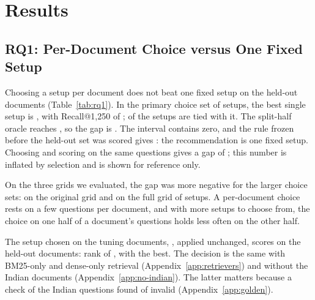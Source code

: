 \section{Results}
\label{sec:results}

\subsection{RQ1: Per-Document Choice versus One Fixed Setup}
\label{sec:rq1}

\begin{table}[t]
\centering
{}
\caption{RQ1 on the held-out documents (\RQoneDocuments{} documents and \RQoneQuestions{} questions in every choice set; hybrid retrieval, Recall@1,250). Short names: Appendix~\ref{app:key}.}
\label{tab:rq1}
\end{table}

Choosing a setup per document does not beat one fixed setup on the
held-out documents (Table~\ref{tab:rq1}). In the primary choice set of
\RQoneSetups{} setups, the best single setup is \RQoneBest{}, with
Recall@1,250 of \RQoneBestRecall{}; \RQoneTied{} of the \RQoneSetups{}
setups are tied with it. The split-half oracle reaches \RQoneOracle{},
so the gap is \RQonePrimaryGap{} \RQonePrimaryGapCI{}. The interval
contains zero, and the rule frozen before the held-out set was scored
gives \RQoneDecision{}: the recommendation is one fixed setup. Choosing
and scoring on the same questions gives a gap of \RQoneRawGap{}; this
number is inflated by selection and is shown for reference only.

On the three grids we evaluated, the gap was more negative for the
larger choice sets: \RQoneOriginalGap{} \RQoneOriginalGapCI{} on the
original grid and \RQoneFullGap{} \RQoneFullGapCI{} on the full grid of
\HeldOutSetups{} setups. A per-document choice rests on a few questions
per document, and with more setups to choose from, the choice on one
half of a document's questions holds less often on the other half.

The setup chosen on the tuning documents, \RQoneTuningWinner{}, applied
unchanged, scores \RQoneTuningWinnerRecall{} on the held-out documents:
rank \RQoneTuningWinnerRank{} of \RQoneSetups{}, \RQoneTuningWinnerTied{}
with the best. The decision is the same with BM25-only and dense-only
retrieval (Appendix~\ref{app:retrievers}) and without the Indian
documents (Appendix~\ref{app:no-indian}). The latter matters because a
check of the Indian questions found \GoldenInvalid{} of
\GoldenSampled{} invalid (Appendix~\ref{app:golden}).

